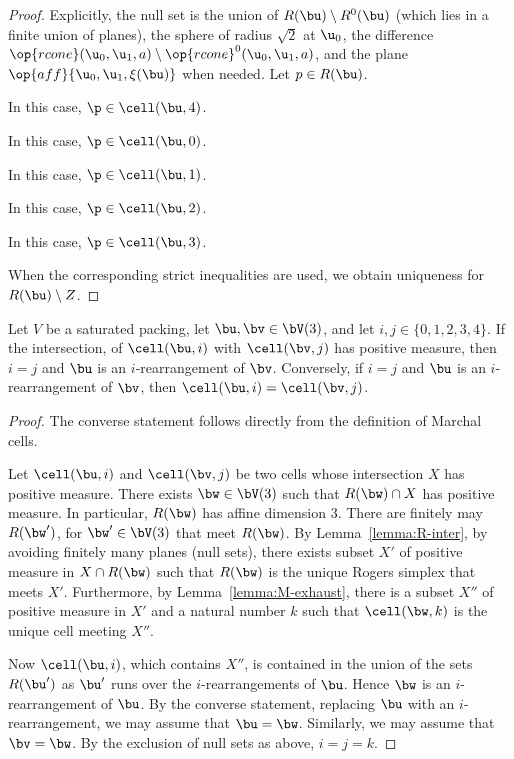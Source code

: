 \begin{proof} 
Explicitly, the null set is the union of $R(\bu)\setminus R^0(\bu)$ (which lies in 
a finite union of planes), the sphere of radius $\sqrt2$ at $\u_0$, 
the difference $\op{rcone}(\u_0,\u_1,a)\setminus \op{rcone}^0(\u_0,\u_1,a)$,
and the
plane $\op{aff}\{\u_0,\u_1,\xi(\bu)\}$ when needed.  Let $p\in R(\bu)$.

\noindent
{} In this case,  $\p\in\cell(\bu,4)$.

\noindent
{} In this case, $\p\in\cell(\bu,0)$.

\noindent
{} 
In this case, $\p\in \cell(\bu,1)$.

\noindent
{} In this
case, $\p\in \cell(\bu,2)$.

\noindent
{} In this
case, $\p\in \cell(\bu,3)$.

When the corresponding strict inequalities are used, we obtain uniqueness for
$R(\bu)\setminus Z$.
\end{proof}




\begin{lemma}[]\label{lemma:marchal-equal} 
Let $V$ be a saturated packing, 
let $\bu,\bv\in \bV(3)$, and let $i,j\in \{0,1,2,3,4\}$.
If the intersection, of
$\cell(\bu,i)$ with $\cell(\bv,j)$ has positive measure,
then $i=j$ and $\bu$ is an $i$-rearrangement of $\bv$.
Conversely, if $i=j$ and $\bu$ is an $i$-rearrangement of $\bv$, 
then $\cell(\bu,i)=\cell(\bv,j)$.
\end{lemma}

\begin{proof} 
The converse statement follows directly from the definition of Marchal cells.

Let $\cell(\bu,i)$ and $\cell(\bv,j)$ be two cells whose intersection
$X$ has positive measure.  There exists $\bw\in \bV(3)$ such that
$R(\bw)\cap X$ has positive measure.  In particular, $R(\bw)$ has
affine dimension $3$.  There are finitely may $R(\bw')$, for $\bw'\in
\bV(3)$ that meet $R(\bw)$.  By Lemma~\ref{lemma:R-inter}, by avoiding
finitely many planes (null sets), there exists subset $X'$ of positive measure
in
$X\cap R(\bw)$ such that $R(\bw)$ is the unique Rogers simplex that
meets $X'$.  Furthermore, by Lemma~\ref{lemma:M-exhaust}, there is a subset $X''$ of
positive measure in $X'$ and a natural number $k$ such that $\cell(\bw,k)$ is
the unique cell meeting $X''$.

Now $\cell(\bu,i)$, which contains $X''$, 
is contained in the union of the sets $R(\bu')$ as $\bu'$ runs over the
$i$-rearrangements of $\bu$.  Hence $\bw$ is an $i$-rearrangement of
$\bu$.  By the converse statement, replacing $\bu$ with an
$i$-rearrangement, we may assume that $\bu=\bw$.  Similarly, we may
assume that $\bv=\bw$.  By the exclusion of null sets as above, $i=j=k$.
\end{proof}



